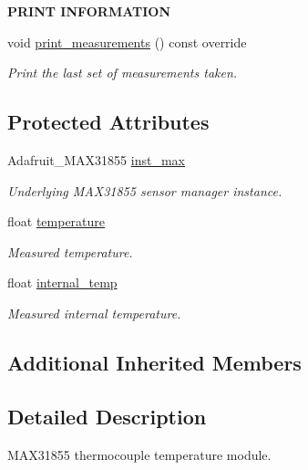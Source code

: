 \begin{Indent}{\bf P\+R\+I\+NT I\+N\+F\+O\+R\+M\+A\+T\+I\+ON}\par
\begin{DoxyCompactItemize}
\item 
void \hyperlink{class_loom___m_a_x31855_a34e5976fb1efa6b33b2d9714dd359477}{print\+\_\+measurements} () const override
\begin{DoxyCompactList}\small\item\em Print the last set of measurements taken. \end{DoxyCompactList}\end{DoxyCompactItemize}
\end{Indent}
\subsection*{Protected Attributes}
\begin{DoxyCompactItemize}
\item 
Adafruit\+\_\+\+M\+A\+X31855 \hyperlink{class_loom___m_a_x31855_abc8e110d6676a57bb91f64f2c5b1c25e}{inst\+\_\+max}
\begin{DoxyCompactList}\small\item\em Underlying M\+A\+X31855 sensor manager instance. \end{DoxyCompactList}\item 
float \hyperlink{class_loom___m_a_x31855_a1e8c46105fee70cedcd505f25a58d62c}{temperature}
\begin{DoxyCompactList}\small\item\em Measured temperature. \end{DoxyCompactList}\item 
float \hyperlink{class_loom___m_a_x31855_a02476a27b49d4193d0534b732246fec4}{internal\+\_\+temp}
\begin{DoxyCompactList}\small\item\em Measured internal temperature. \end{DoxyCompactList}\end{DoxyCompactItemize}
\subsection*{Additional Inherited Members}


\subsection{Detailed Description}
M\+A\+X31855 thermocouple temperature module. 

